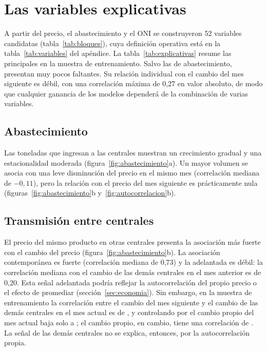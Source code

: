 

\section{Las variables explicativas}
\label{sec:explicativas}

A partir del precio, el abastecimiento y el ONI se construyeron 52 variables candidatas (tabla~\ref{tab:bloques}), cuya definición operativa está en la tabla~\ref{tab:variables} del apéndice. La tabla~\ref{tab:explicativas} resume las principales en la muestra de entrenamiento. Salvo las de abastecimiento, presentan muy pocos faltantes. Su relación individual con el cambio del mes siguiente es débil, con una correlación máxima de 0,27 en valor absoluto, de modo que cualquier ganancia de los modelos dependerá de la combinación de varias variables.



\subsection*{Abastecimiento}

Las toneladas que ingresan a las centrales muestran un crecimiento gradual y una estacionalidad moderada (figura~\ref{fig:abastecimiento}a). Un mayor volumen se asocia con una leve disminución del precio en el mismo mes (correlación mediana de $-0{,}11$), pero la relación con el precio del mes siguiente es prácticamente nula (figuras~\ref{fig:abastecimiento}b y~\ref{fig:autocorrelacion}b).

\subsection*{Transmisión entre centrales}

El precio del mismo producto en otras centrales presenta la asociación más fuerte con el cambio del precio (figura~\ref{fig:abastecimiento}b). La asociación contemporánea es fuerte (correlación mediana de 0,73) y la adelantada es débil: la correlación mediana con el cambio de las demás centrales en el mes anterior es de 0,20. Esta señal adelantada podría reflejar la autocorrelación del propio precio o el efecto de promediar (sección~\ref{sec:economia}). Sin embargo, en la muestra de entrenamiento la correlación entre el cambio del mes siguiente y el cambio de las demás centrales en el mes actual es de \rvwknac, y controlando por el cambio propio del mes actual baja solo a \rvwkparcial; el cambio propio, en cambio, tiene una correlación de \rvwkpropio. La señal de las demás centrales no se explica, entonces, por la autocorrelación propia.

